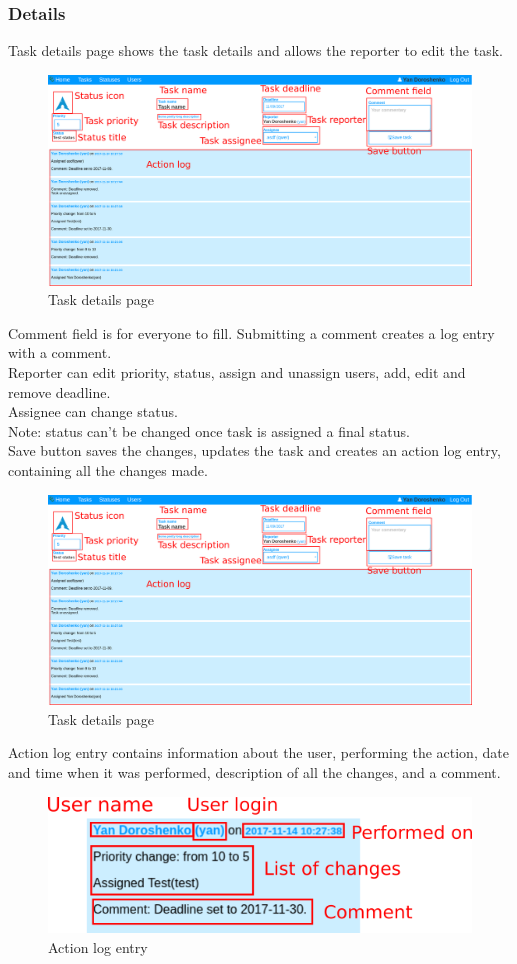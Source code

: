 \documentclass{article}
\begin{document}
\subsubsection{Details}
Task details page shows the task details and allows the reporter to edit the task.
\begin{figure}[H]
    \includegraphics[width=\textwidth]{img/taskdetails.png}
    \caption{Task details page}
\end{figure}
Comment field is for everyone to fill. Submitting a comment creates a log entry with a comment.\\
Reporter can edit priority, status, assign and unassign users, add, edit and remove deadline.\\
Assignee can change status.\\
Note: status can't be changed once task is assigned a final status.\\
Save button saves the changes, updates the task and creates an action log entry, containing all the changes made.\\
\begin{figure}[H]
    \includegraphics[width=\textwidth]{img/taskdetails.png}
    \caption{Task details page}
\end{figure}
Action log entry contains information about the user, performing the action, date and time when it was performed, description of all the changes, and a comment.
\begin{figure}[H]
    \includegraphics[width=\textwidth]{img/action.png}
    \caption{Action log entry}
\end{figure}
\end{document}

